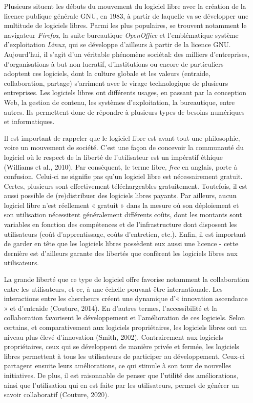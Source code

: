 \documentclass[
  letterpaper,
  DIV=11,
  numbers=noendperiod,
  oneside]{scrreprt}
\begin{document}
Plusieurs situent les débuts du mouvement du logiciel libre avec la
création de la licence publique générale GNU, en 1983, à partir de
laquelle va se développer une multitude de logiciels libres. Parmi les
plus populaires, se trouvent notamment le navigateur \emph{Firefox}, la
suite bureautique \emph{OpenOffice} et l'emblématique système
d'exploitation \emph{Linux}, qui se développe d'ailleurs à partir de la
licence GNU. Aujourd'hui, il s'agit d'un véritable phénomène sociétal:
des milliers d'entreprises, d'organisations à but non lucratif,
d'institutions ou encore de particuliers adoptent ces logiciels, dont la
culture globale et les valeurs (entraide, collaboration, partage)
s'arriment avec le virage technologique de plusieurs entreprises. Les
logiciels libres ont différents usages, en passant par la conception
Web, la gestion de contenu, les systèmes d'exploitation, la bureautique,
entre autres. Ils permettent donc de répondre à plusieurs types de
besoins numériques et informatiques.

Il est important de rappeler que le logiciel libre est avant tout une
philosophie, voire un mouvement de société. C'est une façon de concevoir
la communauté du logiciel où le respect de la liberté de l'utilisateur
est un impératif éthique (Williams et al., 2010). Par conséquent, le
terme libre, \emph{free} en anglais, porte à confusion. Celui-ci ne
signifie pas qu'un logiciel libre est nécessairement gratuit. Certes,
plusieurs sont effectivement téléchargeables gratuitement. Toutefois, il
est aussi possible de (re)distribuer des logiciels libres payants. Par
ailleurs, aucun logiciel libre n'est réellement « gratuit » dans la
mesure où son déploiement et son utilisation nécessitent généralement
différents coûts, dont les montants sont variables en fonction des
compétences et de l'infrastructure dont disposent les utilisateurs (coût
d'apprentissage, coûts d'entretien, etc.). Enfin, il est important de
garder en tête que les logiciels libres possèdent eux aussi une licence
- cette dernière est d'ailleurs garante des libertés que confèrent les
logiciels libres aux utilisateurs.

La grande liberté que ce type de logiciel offre favorise notamment la
collaboration entre les utilisateurs, et ce, à une échelle pouvant être
internationale. Les interactions entre les chercheurs créent une
dynamique d'« innovation ascendante » et d'entraide (Couture, 2014). En
d'autres termes, l'accessibilité et la collaboration favorisent le
développement et l'amélioration de ces logiciels. Selon certains, et
comparativement aux logiciels propriétaires, les logiciels libres ont un
niveau plus élevé d'innovation (Smith, 2002). Contrairement aux
logiciels propriétaires, ceux qui se développent de manière privée et
fermée, les logiciels libres permettent à tous les utilisateurs de
participer au développement. Ceux-ci partagent ensuite leurs
améliorations, ce qui stimule à son tour de nouvelles initiatives. De
plus, il est raisonnable de penser que l'utilité des améliorations,
ainsi que l'utilisation qui en est faite par les utilisateurs, permet de
générer un savoir collaboratif (Couture, 2020).
\end{document}
